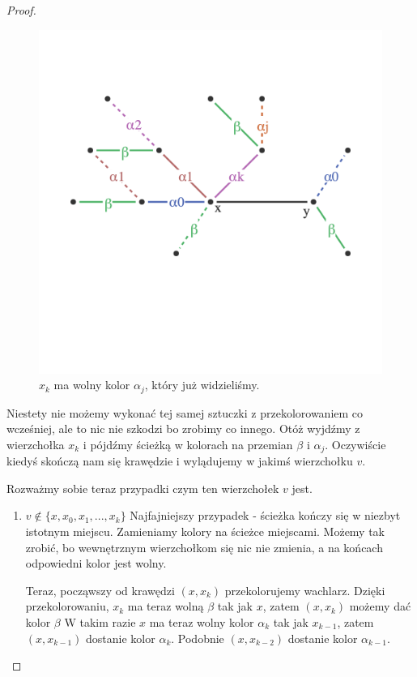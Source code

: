 \begin{proof}
        
        \begin{figure}[ht]
            \centering
            \includegraphics[scale=0.6]{chapters/dyskretna/colours/vizing/images/step_three.png}
            \caption{$x_k$ ma wolny kolor $\alpha_j$, który już widzieliśmy.}
        \end{figure}
        
        Niestety nie możemy wykonać tej samej sztuczki z przekolorowaniem co wcześniej, ale to nic nie szkodzi bo zrobimy co innego.
        Otóż wyjdźmy z wierzchołka $x_k$ i pójdźmy ścieżką w kolorach na przemian $\beta$ i $\alpha_j$.
        Oczywiście kiedyś skończą nam się krawędzie i wylądujemy w jakimś wierzchołku $v$.
        
        Rozważmy sobie teraz przypadki czym ten wierzchołek $v$ jest.
        
        \begin{enumerate}
            \item $v \notin \{x, x_0, x_1, ..., x_k\}$ 
            Najfajniejszy przypadek - ścieżka kończy się w niezbyt istotnym miejscu. Zamieniamy kolory na ścieżce miejscami. Możemy tak zrobić, bo wewnętrznym wierzchołkom się nic nie zmienia, a na końcach odpowiedni kolor jest wolny.
            
            Teraz, począwszy od krawędzi $(x, x_k)$ przekolorujemy wachlarz. 
            Dzięki przekolorowaniu, $x_k$ ma teraz wolną $\beta$ tak jak $x$, zatem $(x, x_k)$ możemy dać kolor $\beta$ 
            W takim razie $x$ ma teraz wolny kolor $\alpha_k$ tak jak $x_{k - 1}$, 
            zatem $(x, x_{k-1})$ dostanie kolor $\alpha_k$.
            Podobnie $(x, x_{k-2})$ dostanie kolor $\alpha_{k-1}$.
            

\end{enumerate}
\end{proof}
